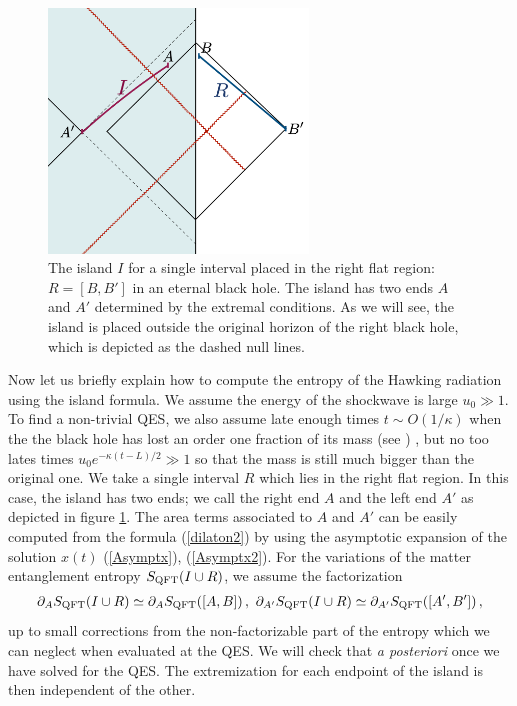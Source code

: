 \documentclass[11pt,oneside,letterpaper]{article}
\def\ba{\begin{eqnarray}}
\def\ea{\end{eqnarray}}
\numberwithin{equation}{section}
\def\pp{\partial}
\def\ba{\begin{eqnarray}}
\def\ea{\end{eqnarray}}
\begin{document}
\begin{spacing}{1.1}
\begin{figure}
     \begin{center}
 \includegraphics[height=6.5cm]{figures/Island_evap2.png}
  \caption{The island $I$ for a single interval placed in the right flat region: $R=[B,B']$ in an eternal black hole. The island has two ends $A$ and $A'$ determined by the extremal conditions. As we will see, the island is placed outside the original horizon of the right black hole, which is depicted as the dashed null lines.}
  \label{conf_island}
 \end{center}
 \end{figure}
  Now let us briefly explain how to compute the entropy of the Hawking radiation using the island formula. We assume the energy of the shockwave is large $u_0\gg 1$.  To find a non-trivial QES, we also assume late enough times $t \sim O(1/\kappa)$ when the the black hole has lost an order one fraction of its mass (see \cite{Almheiri:2019psf}) , but no too lates times  $u_0 e^{-\kappa(t-L)/2} \gg 1$ so that the mass is still much bigger than the original one. We take a single interval $R$ which lies in the right flat region. In this case, the island has two ends; we call the right end $A$ and the left end $A'$ as depicted in figure \ref{conf_island}.    The area terms associated to $A$ and $A'$ can be easily computed from the formula (\ref{dilaton2}) by using the asymptotic expansion of the solution $x(t)$ (\ref{Asymptx}), (\ref{Asymptx2}). For the variations of the matter entanglement entropy $S_{\rm QFT}(I\cup R)$, we assume the factorization 
     \ba\label{factorization}
\pp_{A} S_{\rm QFT}(I\cup R)\simeq \pp_{A}  S_{\rm QFT}([A,B])\, ,\
\pp_{A'} S_{\rm QFT}(I\cup R)\simeq \pp_{A'}  S_{\rm QFT}([A',B'])\, ,
\ea
up to small corrections from the non-factorizable part of the entropy which we can neglect when evaluated at the QES. We will check that \textit{a posteriori} once we have solved for the QES. The extremization for each endpoint of the island is then independent of the other.

\end{spacing}
\end{document}
